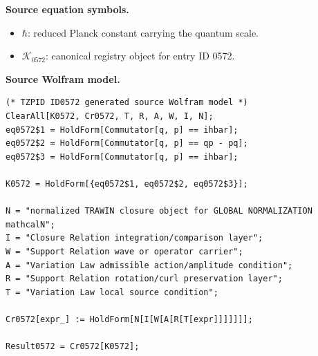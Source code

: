 \begin{minipage}[t]{0.49\linewidth}
\begingroup
\small
\raggedright
\textbf{Source equation symbols.}\par
\begin{itemize}[leftmargin=1.35em,itemsep=1pt,topsep=1pt,parsep=0pt]
    \item $\hbar$: reduced Planck constant carrying the quantum scale.
    \item $\mathcal{K}_{0572}$: canonical registry object for entry ID 0572.
\end{itemize}
\endgroup
\end{minipage}\hfill
\begin{minipage}[t]{0.47\linewidth}
\begingroup
\scriptsize
\raggedright
\textbf{Source Wolfram model.}\par
\begin{Verbatim}[fontsize=\tiny,breaklines=true,breakanywhere=true]
(* TZPID ID0572 generated source Wolfram model *)
ClearAll[K0572, Cr0572, T, R, A, W, I, N];
eq0572$1 = HoldForm[Commutator[q, p] == ihbar];
eq0572$2 = HoldForm[Commutator[q, p] == qp - pq];
eq0572$3 = HoldForm[Commutator[q, p] == ihbar];

K0572 = HoldForm[{eq0572$1, eq0572$2, eq0572$3}];

N = "normalized TRAWIN closure object for GLOBAL NORMALIZATION mathcalN";
I = "Closure Relation integration/comparison layer";
W = "Support Relation wave or operator carrier";
A = "Variation Law admissible action/amplitude condition";
R = "Support Relation rotation/curl preservation layer";
T = "Variation Law local source condition";

Cr0572[expr_] := HoldForm[N[I[W[A[R[T[expr]]]]]]];

Result0572 = Cr0572[K0572];
\end{Verbatim}
\endgroup
\end{minipage}

